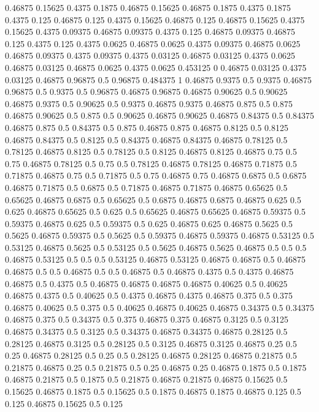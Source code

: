 0.46875 0.15625
0.4375 0.1875
0.46875 0.15625
0.46875 0.1875
0.4375 0.1875
0.4375 0.125
0.46875 0.125
0.4375 0.15625
0.46875 0.125
0.46875 0.15625
0.4375 0.15625
0.4375 0.09375
0.46875 0.09375
0.4375 0.125
0.46875 0.09375
0.46875 0.125
0.4375 0.125
0.4375 0.0625
0.46875 0.0625
0.4375 0.09375
0.46875 0.0625
0.46875 0.09375
0.4375 0.09375
0.4375 0.03125
0.46875 0.03125
0.4375 0.0625
0.46875 0.03125
0.46875 0.0625
0.4375 0.0625
0.453125 0
0.46875 0.03125
0.4375 0.03125
0.46875 0.96875
0.5 0.96875
0.484375 1
0.46875 0.9375
0.5 0.9375
0.46875 0.96875
0.5 0.9375
0.5 0.96875
0.46875 0.96875
0.46875 0.90625
0.5 0.90625
0.46875 0.9375
0.5 0.90625
0.5 0.9375
0.46875 0.9375
0.46875 0.875
0.5 0.875
0.46875 0.90625
0.5 0.875
0.5 0.90625
0.46875 0.90625
0.46875 0.84375
0.5 0.84375
0.46875 0.875
0.5 0.84375
0.5 0.875
0.46875 0.875
0.46875 0.8125
0.5 0.8125
0.46875 0.84375
0.5 0.8125
0.5 0.84375
0.46875 0.84375
0.46875 0.78125
0.5 0.78125
0.46875 0.8125
0.5 0.78125
0.5 0.8125
0.46875 0.8125
0.46875 0.75
0.5 0.75
0.46875 0.78125
0.5 0.75
0.5 0.78125
0.46875 0.78125
0.46875 0.71875
0.5 0.71875
0.46875 0.75
0.5 0.71875
0.5 0.75
0.46875 0.75
0.46875 0.6875
0.5 0.6875
0.46875 0.71875
0.5 0.6875
0.5 0.71875
0.46875 0.71875
0.46875 0.65625
0.5 0.65625
0.46875 0.6875
0.5 0.65625
0.5 0.6875
0.46875 0.6875
0.46875 0.625
0.5 0.625
0.46875 0.65625
0.5 0.625
0.5 0.65625
0.46875 0.65625
0.46875 0.59375
0.5 0.59375
0.46875 0.625
0.5 0.59375
0.5 0.625
0.46875 0.625
0.46875 0.5625
0.5 0.5625
0.46875 0.59375
0.5 0.5625
0.5 0.59375
0.46875 0.59375
0.46875 0.53125
0.5 0.53125
0.46875 0.5625
0.5 0.53125
0.5 0.5625
0.46875 0.5625
0.46875 0.5
0.5 0.5
0.46875 0.53125
0.5 0.5
0.5 0.53125
0.46875 0.53125
0.46875 0.46875
0.5 0.46875
0.46875 0.5
0.5 0.46875
0.5 0.5
0.46875 0.5
0.46875 0.4375
0.5 0.4375
0.46875 0.46875
0.5 0.4375
0.5 0.46875
0.46875 0.46875
0.46875 0.40625
0.5 0.40625
0.46875 0.4375
0.5 0.40625
0.5 0.4375
0.46875 0.4375
0.46875 0.375
0.5 0.375
0.46875 0.40625
0.5 0.375
0.5 0.40625
0.46875 0.40625
0.46875 0.34375
0.5 0.34375
0.46875 0.375
0.5 0.34375
0.5 0.375
0.46875 0.375
0.46875 0.3125
0.5 0.3125
0.46875 0.34375
0.5 0.3125
0.5 0.34375
0.46875 0.34375
0.46875 0.28125
0.5 0.28125
0.46875 0.3125
0.5 0.28125
0.5 0.3125
0.46875 0.3125
0.46875 0.25
0.5 0.25
0.46875 0.28125
0.5 0.25
0.5 0.28125
0.46875 0.28125
0.46875 0.21875
0.5 0.21875
0.46875 0.25
0.5 0.21875
0.5 0.25
0.46875 0.25
0.46875 0.1875
0.5 0.1875
0.46875 0.21875
0.5 0.1875
0.5 0.21875
0.46875 0.21875
0.46875 0.15625
0.5 0.15625
0.46875 0.1875
0.5 0.15625
0.5 0.1875
0.46875 0.1875
0.46875 0.125
0.5 0.125
0.46875 0.15625
0.5 0.125
